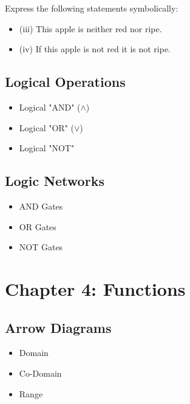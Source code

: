 \documentclass{article}
\begin{document}
 
Express the following statements symbolically:
\begin{itemize}
\item (iii) This apple is neither red nor ripe.
\item (iv) If this apple is not red it is not ripe.
\end{itemize}



\subsection{Logical Operations}

\begin{itemize}
\item Logical "AND" ($\wedge$)
\item Logical "OR" ($\vee$)
\item Logical "NOT" 
\end{itemize}
\newpage

\subsection*{Logic Networks}
\begin{itemize}
\item AND Gates
\item OR Gates
\item NOT Gates
\end{itemize}

\newpage

\section*{Chapter 4: Functions}

\subsection{Arrow Diagrams}

\begin{itemize}
\item Domain 
\item Co-Domain 
\item Range
\end{itemize}
\end{document}
